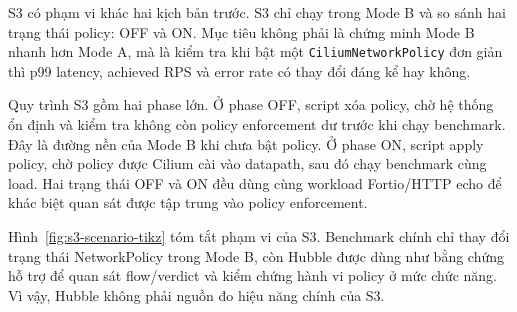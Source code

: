 S3 có phạm vi khác hai kịch bản trước. S3 chỉ chạy trong Mode B và so sánh hai trạng thái policy: OFF và ON. Mục tiêu không phải là chứng minh Mode B nhanh hơn Mode A, mà là kiểm tra khi bật một \texttt{CiliumNetworkPolicy} đơn giản thì p99 latency, achieved RPS và error rate có thay đổi đáng kể hay không.

Quy trình S3 gồm hai phase lớn. Ở phase OFF, script xóa policy, chờ hệ thống ổn định và kiểm tra không còn policy enforcement dư trước khi chạy benchmark. Đây là đường nền của Mode B khi chưa bật policy. Ở phase ON, script apply policy, chờ policy được Cilium cài vào datapath, sau đó chạy benchmark cùng load. Hai trạng thái OFF và ON đều dùng cùng workload Fortio/HTTP echo để khác biệt quan sát được tập trung vào policy enforcement.

Hình~\ref{fig:s3-scenario-tikz} tóm tắt phạm vi của S3. Benchmark chính chỉ thay đổi trạng thái NetworkPolicy trong Mode B, còn Hubble được dùng như bằng chứng hỗ trợ để quan sát flow/verdict và kiểm chứng hành vi policy ở mức chức năng. Vì vậy, Hubble không phải nguồn đo hiệu năng chính của S3.

